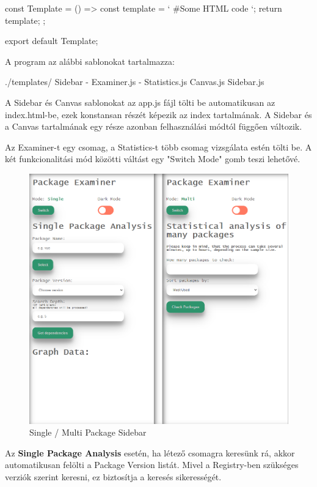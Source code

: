 \begin{cpp}
	const Template = () => {
		const template = `
		#Some HTML code
		`;
		return template;
	};

	export default Template;
\end{cpp}

A program az alábbi sablonokat tartalmazza:
\begin{cpp}
./templates/	
	Sidebar
	- Examiner.js
	- Statistics.js
	Canvas.js
	Sidebar.js
\end{cpp}

A Sidebar és Canvas sablonokat az app.js fájl tölti be automatikusan az index.html-be, ezek konstansan részét képezik az index tartalmának. A Sidebar és a Canvas tartalmának egy része azonban felhasználási módtól függően változik.

Az Examiner-t egy csomag, a Statistics-t több csomag vizsgálata estén tölti be. A két funkcionalitási mód közötti váltást egy "Switch Mode" gomb teszi lehetővé.\\

\begin{figure}[!h]
	\centering
	\includegraphics[scale=0.2]{images/ui_modes.png}
	\caption{Single / Multi Package Sidebar}
	\label{fig:ui_modes}
\end{figure}

\pagebreak


Az \textbf{Single Package Analysis} esetén, ha létező csomagra keresünk rá, akkor automatikusan felölti a Package Version listát. Mivel a Registry-ben szükséges verziók szerint keresni, ez biztosítja a keresés sikerességét.\\

